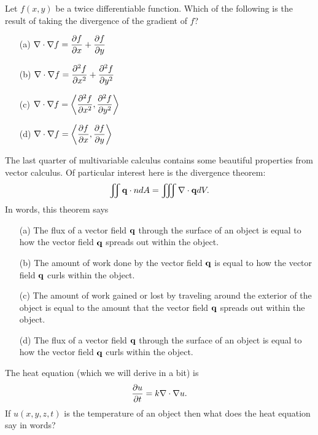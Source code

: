 \begin{problem}
    Let $f(x,y)$ be a twice differentiable function.  Which of the following is the result
    of taking the divergence of the gradient of $f$?
    \begin{itemize}
        \item[(a)] $\displaystyle \nabla \cdot \nabla f = \frac{\partial f}{\partial x} + \frac{\partial f}{\partial y}$
        \item[(b)] $\displaystyle \nabla \cdot \nabla f = \frac{\partial^2 f}{\partial x^2} + \frac{\partial^2 f}{\partial y^2}$
        \item[(c)] $\displaystyle \nabla \cdot \nabla f = \left< \frac{\partial^2 f}{\partial x^2} ,  \frac{\partial^2 f}{\partial y^2}
            \right>$
        \item[(d)] $\displaystyle \nabla \cdot \nabla f = \left< \frac{\partial f}{\partial x} , \frac{\partial f}{\partial y}
            \right>$
    \end{itemize}
\end{problem}

\begin{problem}
    The last quarter of multivariable calculus contains some beautiful properties from
    vector calculus.  Of particular interest here is the divergence theorem:
    \[ \iint {\bf q} \cdot n dA = \iiint \nabla \cdot {\bf q} dV. \]
    In words, this theorem says
    \begin{itemize}
        \item[(a)] The flux of a vector field ${\bf q}$ through the surface of an object is
            equal to how the vector  field ${\bf q}$ spreads out within the object.
        \item[(b)] The amount of work done by the vector field ${\bf q}$ is equal to how the
            vector field ${\bf q}$ curls within the object.
        \item[(c)] The amount of work gained or lost by traveling around the exterior of
            the object is equal to the amount that the vector field ${\bf q}$ spreads out
            within the object.
        \item[(d)] The flux of a vector field ${\bf q}$ through the surface of an object is
            equal to how the vector field ${\bf q}$ curls within the object.
    \end{itemize}
\end{problem}

\begin{problem}
    The heat equation (which we will derive in a bit) is 
    \[ \frac{\partial u}{\partial t} = k \nabla \cdot \nabla u. \]
    If $u(x,y,z,t)$ is the temperature of an object then what does the heat equation say
    in words?
\end{problem}


